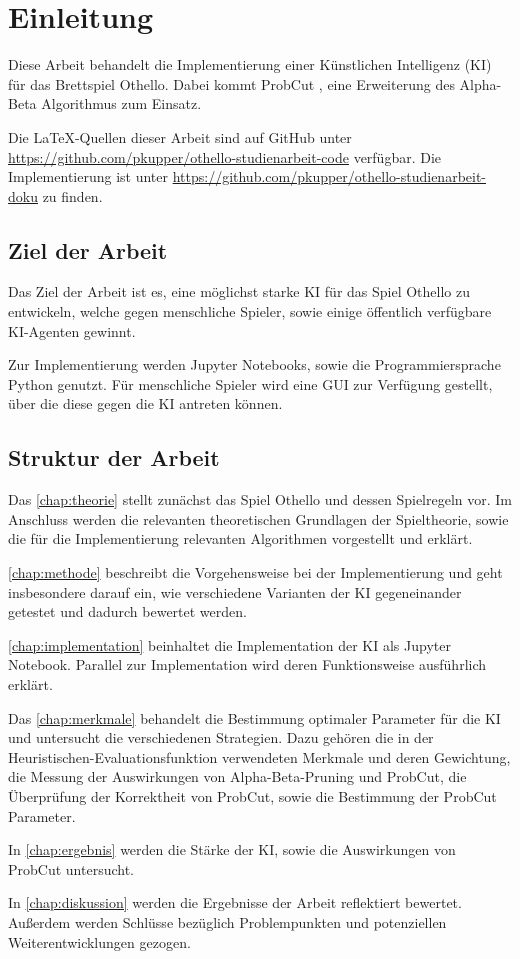 
\chapter{Einleitung}
\label{chap:einleitung}

Diese Arbeit behandelt die Implementierung einer Künstlichen Intelligenz (\acs{KI}) für das Brettspiel Othello. Dabei kommt ProbCut
\cite[S.~1]{probcut}, eine Erweiterung des Alpha-Beta Algorithmus zum Einsatz.

Die \LaTeX-Quellen dieser Arbeit sind auf GitHub unter \url{https://github.com/pkupper/othello-studienarbeit-code}
verfügbar. Die Implementierung ist unter \url{https://github.com/pkupper/othello-studienarbeit-doku} zu finden.

\section{Ziel der Arbeit}
\label{sec:goal}

Das Ziel der Arbeit ist es, eine möglichst starke \ac{KI} für das Spiel Othello zu entwickeln, welche
gegen menschliche Spieler, sowie einige öffentlich verfügbare \ac{KI}-Agenten gewinnt.

Zur Implementierung werden Jupyter Notebooks, sowie die Programmiersprache Python genutzt. Für menschliche Spieler wird
eine \ac{GUI} zur Verfügung gestellt, über die diese gegen die \ac{KI} antreten können.

\section{Struktur der Arbeit}
Das \autoref{chap:theorie} stellt zunächst das Spiel Othello und dessen Spielregeln vor. Im Anschluss werden die
relevanten theoretischen Grundlagen der Spieltheorie, sowie die für die Implementierung relevanten Algorithmen
vorgestellt und erklärt.

\autoref{chap:methode} beschreibt die Vorgehensweise bei der Implementierung und geht insbesondere darauf ein, wie
verschiedene Varianten der \ac{KI} gegeneinander getestet und dadurch bewertet werden.

\autoref{chap:implementation} beinhaltet die Implementation der \ac{KI} als Jupyter Notebook. Parallel
zur Implementation wird deren Funktionsweise ausführlich erklärt.

Das \autoref{chap:merkmale} behandelt die Bestimmung optimaler Parameter für die \ac{KI} und untersucht die
verschiedenen Strategien. Dazu gehören die in der Heuristischen-Evaluationsfunktion verwendeten Merkmale und deren
Gewichtung, die Messung der Auswirkungen von Alpha-Beta-Pruning und ProbCut, die Überprüfung der Korrektheit von
ProbCut, sowie die Bestimmung der ProbCut Parameter.

In \autoref{chap:ergebnis} werden die Stärke der \ac{KI}, sowie die Auswirkungen von ProbCut untersucht.

In \autoref{chap:diskussion} werden die Ergebnisse der Arbeit reflektiert bewertet. Außerdem werden Schlüsse bezüglich
Problempunkten und potenziellen Weiterentwicklungen gezogen.